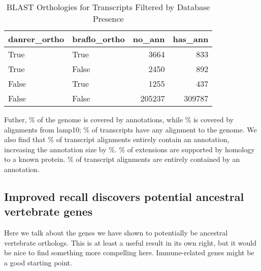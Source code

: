 \documentclass[10pt,twocolumn,linenumbers]{article}
\begin{document}
\begin{table*}[H]
\caption {BLAST Orthologies for Transcripts Filtered by Database Presence}
\begin{center}

\begin{tabular}{llrr}
\toprule
danrer\_ortho & braflo\_ortho &  no\_ann &  has\_ann \\
\midrule
        True &         True &    3664 &      833 \\
        True &        False &    2450 &      892 \\
       False &         True &    1255 &      437 \\
       False &        False &  205237 &   309787 \\
\bottomrule
\end{tabular}



\end{center}
\end{table*}


Futher, \% of the genome is covered by annotations, while \% is covered by alignments from lamp10; 
\% of transcripts have any alignment to the genome. We also find that \% of transcript alignments 
entirely contain an annotation, increasing the annotation size by \%. \% of extensions are supported
by homology to a known protein. \% of transcript alignments are entirely contained by an annotation.



\subsection*{Improved recall discovers potential ancestral vertebrate genes}

Here we talk about the genes we have shown to potentially be ancestral vertebrate orthologs. This is
at least a useful result in its own right, but it would be nice to find something more compelling
here. Immune-related genes might be a good starting point. 


\end{document}
